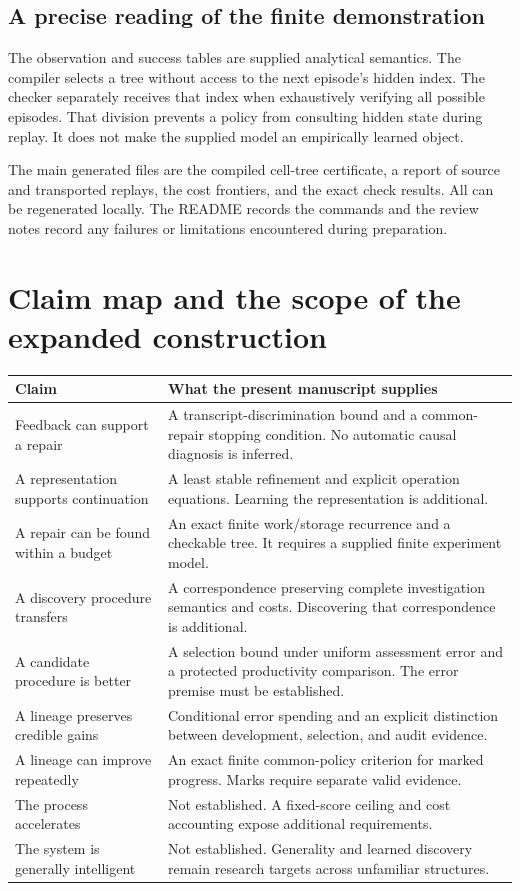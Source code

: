 \documentclass[11pt,letterpaper]{article}
\theoremstyle{plain}
\theoremstyle{definition}
\begin{document}
\subsection{A precise reading of the finite demonstration}
The observation and success tables are supplied analytical semantics. The compiler selects a tree without access to the next episode's hidden index. The checker separately receives that index when exhaustively verifying all possible episodes. That division prevents a policy from consulting hidden state during replay. It does not make the supplied model an empirically learned object.

The main generated files are the compiled cell-tree certificate, a report of source and transported replays, the cost frontiers, and the exact check results. All can be regenerated locally. The README records the commands and the review notes record any failures or limitations encountered during preparation.

\section{Claim map and the scope of the expanded construction}\label{app:claimmap}
\begin{small}\begin{longtable}{@{}p{}p{}@{}}\toprule
Claim & What the present manuscript supplies\\\midrule\endhead
Feedback can support a repair & A transcript-discrimination bound and a common-repair stopping condition. No automatic causal diagnosis is inferred.\\
A representation supports continuation & A least stable refinement and explicit operation equations. Learning the representation is additional.\\
A repair can be found within a budget & An exact finite work/storage recurrence and a checkable tree. It requires a supplied finite experiment model.\\
A discovery procedure transfers & A correspondence preserving complete investigation semantics and costs. Discovering that correspondence is additional.\\
A candidate procedure is better & A selection bound under uniform assessment error and a protected productivity comparison. The error premise must be established.\\
A lineage preserves credible gains & Conditional error spending and an explicit distinction between development, selection, and audit evidence.\\
A lineage can improve repeatedly & An exact finite common-policy criterion for marked progress. Marks require separate valid evidence.\\
The process accelerates & Not established. A fixed-score ceiling and cost accounting expose additional requirements.\\
The system is generally intelligent & Not established. Generality and learned discovery remain research targets across unfamiliar structures.\\\bottomrule
\end{longtable}\end{small}
\end{document}
